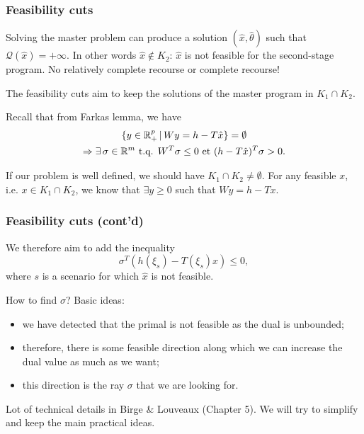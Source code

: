 \documentclass{beamer}
\begin{document}
\begin{frame}
\frametitle{Feasibility cuts}

Solving the master problem can produce a solution $(\hat{x}, \hat{\theta})$ such that $\mathcal{Q}(\hat{x}) = +\infty$.
In other words $\hat{x} \notin K_2$: $\hat{x}$ is not feasible for the second-stage program.
No relatively complete recourse or complete recourse!
	
\mbox{}
	
The {\blue feasibility cuts} aim to keep the solutions of the master program in $K_1 \cap K_2$.
	
\mbox{}
	
\mbox{}

Recall that from Farkas lemma, we have
\begin{multline*}
\lbrace y \in \mathbb{R}^p_+ \,|\, Wy = h-T\hat{x} \rbrace = \emptyset \\
\Rightarrow \exists\, \sigma \in \mathbb{R}^m \mbox{ t.q. } W^T\sigma \leq 0
\mbox{ et } (h-T\hat{x})^T\sigma > 0.
\end{multline*}

\mbox{}

If our problem is well defined, we should have $K_1 \cap K_2 \ne \emptyset$.
For any feasible $x$, i.e. $x \in K_1 \cap K_2$, we know that $\exists y \geq 0$ such that $Wy = h-Tx$.
	
\end{frame}

\begin{frame}
\frametitle{Feasibility cuts (cont'd)}

We therefore aim to add the inequality
\[
\sigma^T(h(\xi_s)-T(\xi_s)x) \leq 0,
\]
where $s$ is a scenario for which $\hat{x}$ is not feasible.
	
\mbox{}
	
How to find $\sigma$? Basic ideas:
\begin{itemize}
\item
we have detected that the primal is not feasible as the dual is unbounded;
\item
therefore, there is some feasible direction along which we can increase the dual value as much as we want;
\item
this direction is the ray $\sigma$ that we are looking for.
\end{itemize}

\mbox{}

Lot of technical details in Birge \& Louveaux (Chapter 5). We will try to simplify and keep the main practical ideas.
	
\end{frame}
\end{document}
